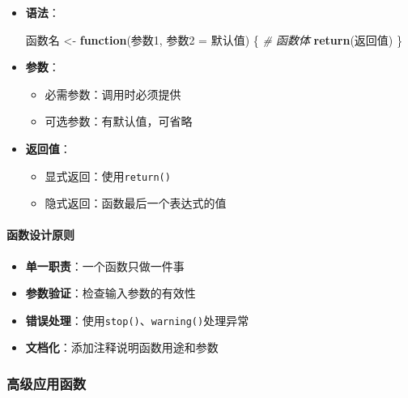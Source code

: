 \documentclass[
]{book}
\newenvironment{Shaded}{\begin{snugshade}}{\end{snugshade}}
\newcommand{\CommentTok}[1]{\textcolor[rgb]{0.56,0.35,0.01}{\textit{#1}}}
\newcommand{\ControlFlowTok}[1]{\textcolor[rgb]{0.13,0.29,0.53}{\textbf{#1}}}
\newcommand{\FunctionTok}[1]{\textcolor[rgb]{0.13,0.29,0.53}{\textbf{#1}}}
\newcommand{\NormalTok}[1]{#1}
\newcommand{\OtherTok}[1]{\textcolor[rgb]{0.56,0.35,0.01}{#1}}
\providecommand{\tightlist}{%
  \setlength{\itemsep}{0pt}\setlength{\parskip}{0pt}}
\begin{document}
\begin{itemize}
\item
  \textbf{语法}：

\begin{Shaded}
\begin{Highlighting}[]
\NormalTok{函数名 }\OtherTok{\textless{}{-}} \ControlFlowTok{function}\NormalTok{(参数1, 参数2 }\OtherTok{=}\NormalTok{ 默认值) \{}
  \CommentTok{\# 函数体}
  \FunctionTok{return}\NormalTok{(返回值)}
\NormalTok{\}}
\end{Highlighting}
\end{Shaded}
\item
  \textbf{参数}：

  \begin{itemize}
  \tightlist
  \item
    必需参数：调用时必须提供
  \item
    可选参数：有默认值，可省略
  \end{itemize}
\item
  \textbf{返回值}：

  \begin{itemize}
  \tightlist
  \item
    显式返回：使用\texttt{return()}
  \item
    隐式返回：函数最后一个表达式的值
  \end{itemize}
\end{itemize}

\hypertarget{ux51fdux6570ux8bbeux8ba1ux539fux5219}{%
\paragraph{函数设计原则}\label{ux51fdux6570ux8bbeux8ba1ux539fux5219}}

\begin{itemize}
\tightlist
\item
  \textbf{单一职责}：一个函数只做一件事
\item
  \textbf{参数验证}：检查输入参数的有效性
\item
  \textbf{错误处理}：使用\texttt{stop()}、\texttt{warning()}处理异常
\item
  \textbf{文档化}：添加注释说明函数用途和参数
\end{itemize}

\hypertarget{ux9ad8ux7ea7ux5e94ux7528ux51fdux6570}{%
\subsubsection{高级应用函数}\label{ux9ad8ux7ea7ux5e94ux7528ux51fdux6570}}
\end{document}
